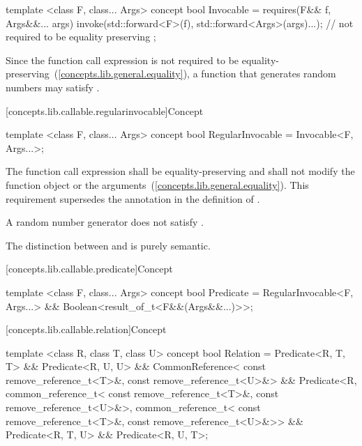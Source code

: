 %
\begin{itemdecl}
template <class F, class... Args>
concept bool Invocable =
  requires(F&& f, Args&&... args) {
    invoke(std::forward<F>(f), std::forward<Args>(args)...); // not required to be equality preserving
  };
\end{itemdecl}

\begin{itemdescr}
\pnum
\enternote Since the  function call
expression is not required to be
equality-preserving~(\ref{concepts.lib.general.equality}), a function that generates random numbers
may satisfy .\exitnote
\end{itemdescr}

[concepts.lib.callable.regularinvocable]{Concept }

%
\begin{itemdecl}
template <class F, class... Args>
concept bool RegularInvocable =
  Invocable<F, Args...>;
\end{itemdecl}

\begin{itemdescr}
\pnum
The  function call expression shall be equality-preserving and
shall not modify the function object or the arguments~(\ref{concepts.lib.general.equality}).
\enternote This requirement supersedes the
annotation in the definition of . \exitnote

\pnum
\enternote A random number generator does not satisfy
.\exitnote

\pnum
\enternote The distinction between  and
 is purely semantic.\exitnote
\end{itemdescr}

[concepts.lib.callable.predicate]{Concept }

%
\begin{itemdecl}
template <class F, class... Args>
concept bool Predicate =
  RegularInvocable<F, Args...> &&
  Boolean<result_of_t<F&&(Args&&...)>>;
\end{itemdecl}

[concepts.lib.callable.relation]{Concept }

%
\begin{itemdecl}
template <class R, class T, class U>
concept bool Relation =
  Predicate<R, T, T> &&
  Predicate<R, U, U> &&
  CommonReference<
    const remove_reference_t<T>&,
    const remove_reference_t<U>&> &&
  Predicate<R,
    common_reference_t<
      const remove_reference_t<T>&,
      const remove_reference_t<U>&>,
    common_reference_t<
      const remove_reference_t<T>&,
      const remove_reference_t<U>&>> &&
  Predicate<R, T, U> &&
  Predicate<R, U, T>;
\end{itemdecl}


